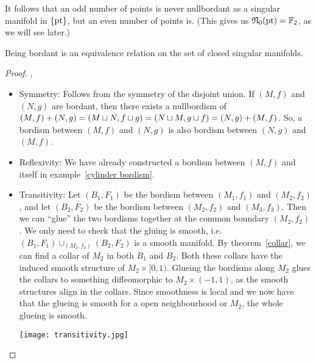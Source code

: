 \documentclass[a4paper,11pt]{article}
\begin{document}
\begin{remark}
     It follows that an odd number of points is never nullbordant as a singular manifold in \(\{\mathrm{pt}\}\), but an even number of points is. (This gives us \(\mathfrak{N}_0(\mathrm{pt})=\mathbb{F}_2\), as we will see later.)
\end{remark}


\begin{proposition}\cite[II, Satz 1.4]{brocker}\label{equivalence bordant}
    Being bordant is an equivalence relation on the set of closed singular manifolds.
\end{proposition}

\begin{proof}\cite{brocker}, \cite[p.8]{conner}
    \begin{itemize}
        \item Symmetry: 
        Follows from the symmetry of the disjoint union. 
        If \((M,f)\) and \((N,g)\) are bordant, then there exists a nullbordism of \((M,f)+(N,g)=(M\sqcup N, f\sqcup g) = (N\sqcup M, g\sqcup f) = (N,g)+ (M,f)\). 
        So, a bordism between \((M,f)\) and \((N,g)\) is also bordism between \((N,g)\) and \((M,f)\).

        \item Reflexivity: 
        We have already constructed a bordism between \((M,f)\) and itself in example\ \ref{cylinder bordism}.

        \item Transitivity: 
        Let \((B_1,F_1)\) be the bordism between \((M_1,f_1)\) and \((M_2,f_2)\), and let \((B_2,F_2)\) be the bordism between \((M_2,f_2)\) and \((M_3,f_3)\). Then we can \enquote{glue} the two bordisms together at the common boundary \((M_2,f_2)\). 
        We only need to check that the gluing is smooth, i.e.\ \((B_1,F_1)\cup_{(M_2,f_2)}(B_2,F_2)\) is a smooth manifold. 
        By theorem\ \ref{collar}, we can find a collar of \(M_2\) in both \(B_1\) and \(B_2\). 
        Both these collars have the induced smooth structure of \(M_2\times [0,1)\). 
        Glueing the bordisms along \(M_2\) glues the collars to something diffeomorphic to \(M_2\times (-1,1)\), as the smooth structures align in the collars. 
        Since smoothness is local and we now have that the glueing is smooth for a open neighbourhood or \(M_2\), the whole glueing is smooth.
        \begin{center}
            \texttt{[image: transitivity.jpg]}
        \end{center}
    \end{itemize}
\end{proof}
\end{document}
